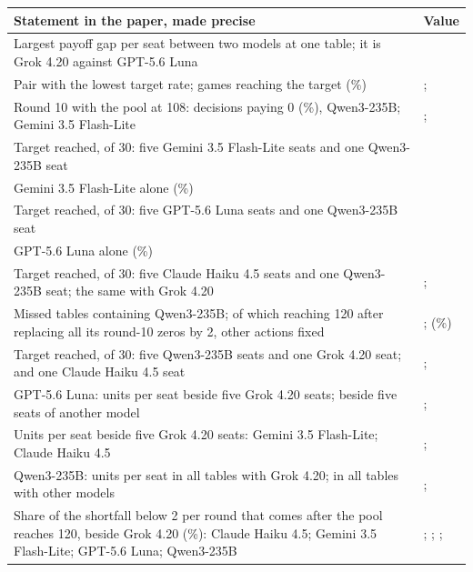 \documentclass[10pt]{article}
\makeatletter
\newenvironment{claims}{\small\begin{tabular}{@{}>{\raggedright\arraybackslash}p{0.74\textwidth}>{\raggedleft\arraybackslash}p{0.2\textwidth}@{}}\toprule Statement in the paper, made precise & Value \\\midrule}{\bottomrule\end{tabular}}
\makeatother
\begin{document}
\begin{center}
\begin{claims}
Largest payoff gap per seat between two models at one table; it is Grok 4.20 against GPT-5.6 Luna & \AdvMaxAbs{} \\
Pair with the lowest target rate; games reaching the target (\%) & \AdvPairLowReachName{}; \AdvPairLowReachPct{} \\
Round 10 with the pool at 108: decisions paying 0 (\%), Qwen3-235B; Gemini 3.5 Flash-Lite & \MixQwenPotZeroPct{}; \MixFlashPotZeroPct{} \\
Target reached, of 30: five Gemini 3.5 Flash-Lite seats and one Qwen3-235B seat & \MixFlashQwenReach{} \\
\quad Gemini 3.5 Flash-Lite alone (\%) & \MixFlashAloneReach{} \\
Target reached, of 30: five GPT-5.6 Luna seats and one Qwen3-235B seat & \MixLunaQwenReach{} \\
\quad GPT-5.6 Luna alone (\%) & \MixLunaAloneReach{} \\
Target reached, of 30: five Claude Haiku 4.5 seats and one Qwen3-235B seat; the same with Grok 4.20 & \MixHaikuQwenReach{}; \MixGrokQwenReach{} \\
Missed tables containing Qwen3-235B; of which reaching 120 after replacing all its round-10 zeros by 2, other actions fixed & \MixMissWithQwen{}; \SupMixQwenPivotalFixed{} (\MixQwenPivotalFix\%) \\
Target reached, of 30: five Qwen3-235B seats and one Grok 4.20 seat; and one Claude Haiku 4.5 seat & \MixGrokRescuesQwen{}; \MixHaikuRescuesQwen{} \\
GPT-5.6 Luna: units per seat beside five Grok 4.20 seats; beside five seats of another model & \MixLunaBesideFiveGrok{}; \MixLunaBesideOthers{} \\
Units per seat beside five Grok 4.20 seats: Gemini 3.5 Flash-Lite; Claude Haiku 4.5 & \MixFlashBesideFiveGrok{}; \MixHaikuBesideFiveGrok{} \\
Qwen3-235B: units per seat in all tables with Grok 4.20; in all tables with other models & \MixQwenBesideGrok{}; \MixQwenBesideOthers{} \\
Share of the shortfall below 2 per round that comes after the pool reaches 120, beside Grok 4.20 (\%): Claude Haiku 4.5; Gemini 3.5 Flash-Lite; GPT-5.6 Luna; Qwen3-235B & \SupMixTimingHaikuAfterPct{}; \SupMixTimingFlashAfterPct{}; \SupMixTimingLunaAfterPct{}; \SupMixTimingQwenAfterPct{} \\
\end{claims}
\end{center}
\end{document}
